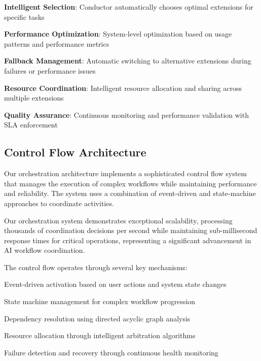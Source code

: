 \begin{expandedlist}
    \item \textbf{Intelligent Selection}: Conductor automatically chooses optimal extensions for specific tasks
    \item \textbf{Performance Optimization}: System-level optimization based on usage patterns and performance metrics
    \item \textbf{Fallback Management}: Automatic switching to alternative extensions during failures or performance issues
    \item \textbf{Resource Coordination}: Intelligent resource allocation and sharing across multiple extensions
    \item \textbf{Quality Assurance}: Continuous monitoring and performance validation with SLA enforcement
\end{expandedlist}

\subsection*{Control Flow Architecture}

Our orchestration architecture implements a sophisticated control flow system that manages the execution of complex workflows while maintaining performance and reliability. The system uses a combination of event-driven and state-machine approaches to coordinate activities.

\begin{successbox}
Our orchestration system demonstrates exceptional scalability, processing thousands of coordination decisions per second while maintaining sub-millisecond response times for critical operations, representing a significant advancement in AI workflow coordination.
\end{successbox}

The control flow operates through several key mechanisms:

\begin{compactlist}
    \item Event-driven activation based on user actions and system state changes
    \item State machine management for complex workflow progression
    \item Dependency resolution using directed acyclic graph analysis
    \item Resource allocation through intelligent arbitration algorithms
    \item Failure detection and recovery through continuous health monitoring
\end{compactlist}

